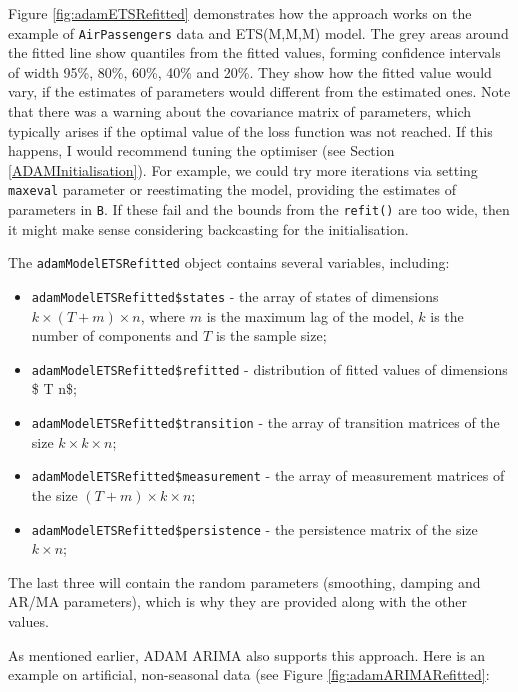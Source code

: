 \documentclass[
]{book}
\providecommand{\tightlist}{%
  \setlength{\itemsep}{0pt}\setlength{\parskip}{0pt}}
\theoremstyle{definition}
\theoremstyle{definition}
\theoremstyle{definition}
\theoremstyle{definition}
\theoremstyle{remark}
\begin{document}
Figure \ref{fig:adamETSRefitted} demonstrates how the approach works on the example of \texttt{AirPassengers} data and ETS(M,M,M) model. The grey areas around the fitted line show quantiles from the fitted values, forming confidence intervals of width 95\%, 80\%, 60\%, 40\% and 20\%. They show how the fitted value would vary, if the estimates of parameters would different from the estimated ones. Note that there was a warning about the covariance matrix of parameters, which typically arises if the optimal value of the loss function was not reached. If this happens, I would recommend tuning the optimiser (see Section \ref{ADAMInitialisation}). For example, we could try more iterations via setting \texttt{maxeval} parameter or reestimating the model, providing the estimates of parameters in \texttt{B}. If these fail and the bounds from the \texttt{refit()} are too wide, then it might make sense considering backcasting for the initialisation.

The \texttt{adamModelETSRefitted} object contains several variables, including:

\begin{itemize}
\tightlist
\item
  \texttt{adamModelETSRefitted\$states} - the array of states of dimensions \(k \times (T+m) \times n\), where \(m\) is the maximum lag of the model, \(k\) is the number of components and \(T\) is the sample size;
\item
  \texttt{adamModelETSRefitted\$refitted} - distribution of fitted values of dimensions \$ T \times n\$;
\item
  \texttt{adamModelETSRefitted\$transition} - the array of transition matrices of the size \(k \times k \times n\);
\item
  \texttt{adamModelETSRefitted\$measurement} - the array of measurement matrices of the size \((T+m) \times k \times n\);
\item
  \texttt{adamModelETSRefitted\$persistence} - the persistence matrix of the size \(k \times n\);
\end{itemize}

The last three will contain the random parameters (smoothing, damping and AR/MA parameters), which is why they are provided along with the other values.

As mentioned earlier, ADAM ARIMA also supports this approach. Here is an example on artificial, non-seasonal data (see Figure \ref{fig:adamARIMARefitted}:
\end{document}
